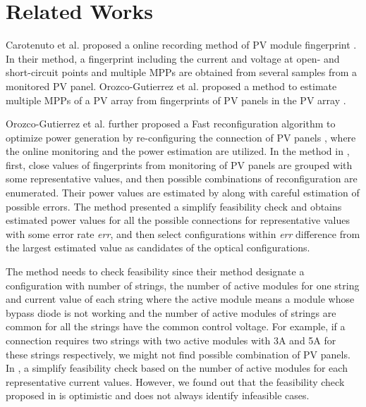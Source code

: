 \documentclass[conference]{IEEEtran}
\begin{document}


\section{Related Works}
Carotenuto et al. proposed a online recording method of PV module fingerprint \cite{b6}. In their method, a fingerprint including the current and voltage at open- and short-circuit points and multiple MPPs are obtained from several samples from a monitored PV panel. Orozco-Gutierrez et al. proposed a method to estimate multiple MPPs of a PV array from fingerprints of PV panels in the PV array \cite{b7}.

Orozco-Gutierrez et al. further proposed a Fast reconfiguration algorithm to optimize power generation by re-configuring the connection of PV panels \cite{b10}, where the online monitoring \cite{b6} and the power estimation \cite{b7} are utilized. In the method in \cite{b10}, first, close values of fingerprints from monitoring of PV panels are grouped with some representative values, and then possible combinations of reconfiguration are enumerated. Their power values are estimated by \cite{b7} along with careful estimation of possible errors. The method presented a simplify feasibility check and obtains estimated power values for all the possible connections for representative values with some error rate \textit{err}, and then select configurations within \textit{err} difference from the largest estimated value as candidates of the optical configurations. 

The method \cite{b10} needs to check feasibility since their method designate a configuration with number of strings, the number of active modules for one string and current value of each string where the active module means a module whose bypass diode is not working and the number of active modules of strings are common for all the strings have the common control voltage. For example, if a connection requires two strings with two active modules with 3A and 5A for these strings respectively, we might not find possible combination of PV panels. In \cite{b10}, a simplify feasibility check based on the number of active modules for each representative current values. However, we found out that the feasibility check proposed in \cite{b10} is optimistic and does not always identify infeasible cases. 
\end{document}
